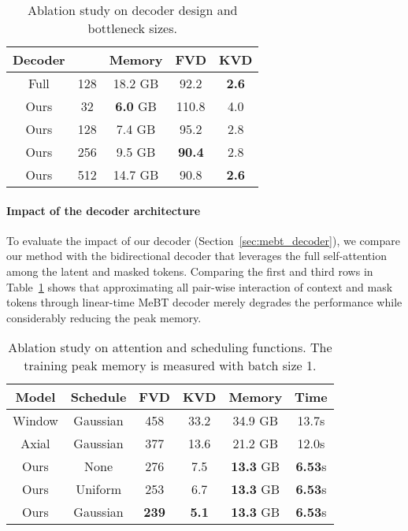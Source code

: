\documentclass[10pt,twocolumn,letterpaper]{article}
\newcommand{\cutparagraphup}{\vspace*{-0.1in}}
\begin{document}
\begin{table}[t]
    \caption{Ablation study on decoder design and bottleneck sizes.}
    \vspace{-0.3cm}
    \label{tab:16f_ablation}
    \centering
    \footnotesize
    \begin{tabular}{cc|ccc}
    \toprule
    Decoder & & Memory & FVD & KVD \\
    \midrule
    Full & 128 & 18.2 GB & { 92.2\tiny{}} & {\bf 2.6\tiny{}} \\
    \hline
    Ours & 32 & {\bf 6.0} GB & 110.8\tiny{} & 4.0\tiny{} \\
    Ours & 128 & {7.4} GB & 95.2\tiny{} & 2.8\tiny{} \\
    Ours & 256 & {9.5} GB & {\bf 90.4}\tiny{} & 2.8\tiny{} \\
    Ours & 512 & {14.7} GB & 90.8\tiny{} & \bf{2.6}\tiny{} \\
    \bottomrule
    \end{tabular}
    \vspace{-0.3cm}
\end{table}

\cutparagraphup
\paragraph{Impact of the decoder architecture}
\label{sec:dec_ablation}
To evaluate the impact of our decoder (Section~\ref{sec:mebt_decoder}), we compare our method with the bidirectional decoder that leverages the full self-attention among the latent and masked tokens.
Comparing the first and third rows in Table~\ref{tab:16f_ablation} shows that approximating all pair-wise interaction of context and mask tokens through linear-time MeBT decoder merely degrades the performance while considerably reducing the peak memory.


\begin{table}[t]
\caption{Ablation study on attention and scheduling functions. The training peak memory is measured with batch size 1.}
\label{tab:128f_ablation}
\vspace{-0.3cm}
    \centering
    \footnotesize
    \begin{tabular}{cc|cccc}
    \toprule
        Model & Schedule & FVD & KVD & Memory & Time\\
    \midrule
        Window & Gaussian & 458\tiny & 33.2\tiny & 34.9 GB & 13.7s\\
        Axial & Gaussian & 377\tiny& 13.6\tiny & 21.2 GB & 12.0s \\
\hline
        Ours & None & 276\tiny{} & 7.5\tiny{} & \textbf{13.3} GB & \textbf{6.53}s\\
        Ours & Uniform & 253\tiny{} & 6.7\tiny{} & \textbf{13.3} GB & \textbf{6.53}s\\
        \hline
        Ours & Gaussian & \textbf{239\tiny} & \textbf{5.1}\tiny & \textbf{13.3} GB & \textbf{6.53}s\\
    \bottomrule
    \end{tabular}
\vspace{-0.5cm}
\end{table}
\end{document}
